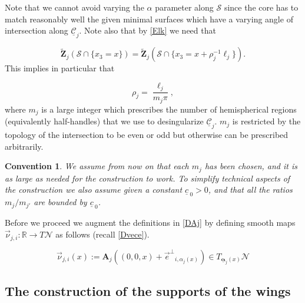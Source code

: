 \documentclass[12pt,namelimits,sumlimits]{amsart}
\newtheorem{convention}[theorem]{Convention}
\theoremstyle{remark}
\numberwithin{equation}{section}
\begin{document}
Note that we cannot avoid varying the $\alpha$ parameter
along ${{\mathcal{S}}}$ since the core has to match reasonably well the given
minimal surfaces which have a varying angle of intersection along ${\underline{{\mathcal{C}}}}_j$.
Note also that by \ref{Elk} we need that
\addtocounter{theorem}{1}
\begin{equation}
\label{EEjrho}
{\widetilde{\boldsymbol{Z}}}_j({{\mathcal{S}}}\cap\{x_3=x\})=
{\widetilde{\boldsymbol{Z}}}_j({{\mathcal{S}}}\cap\{x_3=x+\rho_j^{-1}\ell_j \}).
\end{equation}
This implies in particular that
\addtocounter{theorem}{1}
\begin{equation}
\label{Erhoj}
\rho_j=\frac{\ell_j}{m_j\pi},
\end{equation}
where $m_j$ is a large integer which prescribes the number of hemispherical regions
(equivalently half-handles) that we use to desingularize ${\underline{{\mathcal{C}}}}_j$.
$m_j$ is restricted by the topology of the intersection to be even or odd
but otherwise can be prescribed arbitrarily.
\addtocounter{equation}{1}
\begin{convention}
\label{Cmj}
We assume from now on that each $m_j$ has been chosen,
and it is as large as needed for the construction to work.
To simplify technical aspects of the construction we also assume given a constant ${\underline{c}\,}_0>0$,
and that all the ratios $m_j/m_{j'}$ are bounded by ${\underline{c}\,}_0$.
\end{convention}

Before we proceed we augment the definitions in \ref{DAj} 
by defining smooth maps ${\vec{\nu}}_{{j,i}}:{\mathbb{R}}\to T{{\mathcal{N}}}$ as follows (recall \ref{Dvece}).
\addtocounter{theorem}{1}
\begin{equation}
\label{Enu}
{\vec{\nu}}_{{j,i}}(x)
:=
{\boldsymbol{A}}_j((0,0,x)+{{\vec{e}^\perp}}_{i,\alpha_j(x)})
\in T_{{\underline{\boldsymbol{\alpha}}}_j(x)}{{\mathcal{N}}}
\end{equation}

\subsection*{The construction of the supports of the wings}
$\phantom{ab}$
\nopagebreak
\end{document}
